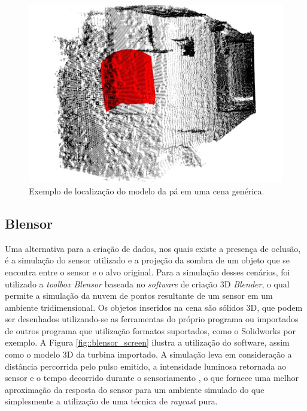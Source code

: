 \begin{figure}[h!]
	\centering
	\includegraphics[width=0.9\columnwidth]{figs/calibracao/blade_office5}
	\caption{Exemplo de localização do modelo da pá em uma cena genérica.}
    \label{fig::pa_cena_gen}
\end{figure}

\subsection{Blensor}

Uma alternativa para a criação de dados, nos quais existe a presença de oclusão,
é a simulação do sensor utilizado e a projeção da sombra de um objeto que se
encontra entre o sensor e o alvo original. Para a simulação desses cenários, foi
utilizado a \textit{toolbox Blensor}\footnotemark
{} baseada no \textit{software} de criação 3D
\textit{Blender}\footnotemark {}, o qual
permite a simulação da nuvem de pontos resultante de um sensor em um ambiente
tridimensional. Os objetos inseridos na cena são sólidos 3D, que podem ser
desenhados utilizando-se as ferramentas do próprio programa ou importados de
outros programa que utilização formatos suportados, como o Solidworks por
exemplo. A Figura \ref{fig::blensor_screen} ilustra a utilização do software,
assim como o modelo 3D da turbina importado. A simulação leva em consideração a
distância percorrida pelo pulso emitido, a intensidade luminosa retornada ao
sensor e o tempo decorrido durante o sensoriamento \cite{Gschwandtner2011}, o
que fornece uma melhor aproximação da resposta do sensor para um ambiente
simulado do que simplesmente a utilização de uma técnica de \textit{raycast} pura.

